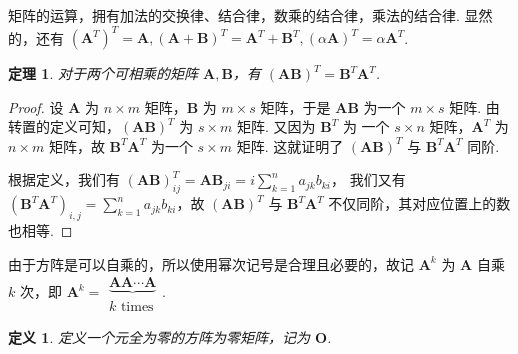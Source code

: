 \documentclass[a4paper]{article}
\newtheorem{theorem}{定理}[section]
\newtheorem{definition}{定义}[section]
\begin{document}
矩阵的运算，拥有加法的交换律、结合律，数乘的结合律，乘法的结合律. 显然的，还有 ${(\boldsymbol A^T)}^T=\boldsymbol A,(\boldsymbol A
+\boldsymbol B)^T=\boldsymbol A^T+\boldsymbol B^T,(\alpha \boldsymbol A)^T=\alpha\boldsymbol A^T$.

\begin{theorem}
    对于两个可相乘的矩阵 $\boldsymbol A,\boldsymbol B$，有 $(\boldsymbol A\boldsymbol B)^T=\boldsymbol B^T\boldsymbol A^T$.
\end{theorem}

\begin{proof}
    设 $\boldsymbol A$ 为 $n\times m$ 矩阵，$\boldsymbol B$ 为 $m\times s$ 矩阵，于是 $\boldsymbol A\boldsymbol B$ 为一个
    $m\times s$ 矩阵. 由转置的定义可知，$(\boldsymbol A\boldsymbol B)^T$ 为 $s\times m$ 矩阵. 又因为 $\boldsymbol B^T$ 为
    一个 $s\times n$ 矩阵，$\boldsymbol A^T$ 为 $n\times m$ 矩阵，故 $\boldsymbol B^T\boldsymbol A^T$ 为一个 $s\times m$
    矩阵. 这就证明了 $(\boldsymbol A\boldsymbol B)^T$ 与 $\boldsymbol B^T\boldsymbol A^T$ 同阶.

    根据定义，我们有 $(\boldsymbol A\boldsymbol B)^T_{ij}=\boldsymbol A\boldsymbol B_{ji}=i\sum\limits_{k=1}^n a_{jk}b_{ki}$，
    我们又有 $(\boldsymbol B^T\boldsymbol A^T)_{i,j}=\sum\limits_{k=1}^n a_{jk}b_{ki}$，故 $(\boldsymbol A\boldsymbol B)^T$ 
    与 $\boldsymbol B^T\boldsymbol A^T$ 不仅同阶，其对应位置上的数也相等.
\end{proof}

由于方阵是可以自乘的，所以使用幂次记号是合理且必要的，故记 $\boldsymbol A^k$ 为 $\boldsymbol A$ 自乘 $k$ 次，即 $\boldsymbol A^k=\begin{matrix}
    \underbrace{\boldsymbol A\boldsymbol A\cdots\boldsymbol A}\\
    k\text{ times}
\end{matrix}$. 

\begin{definition}
    定义一个元全为零的方阵为零矩阵，记为 $\boldsymbol O$.
\end{definition}
\end{document}
